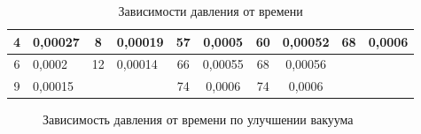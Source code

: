 \documentclass[a4paper, 12pt]{article}
\begin{document}
\begin{enumerate}
\begin{table}[!h]
{\begin{tabular}{|c|l|cl|c|c|c|c|cc}
				{\color[HTML]{000000} 4} & {\color[HTML]{000000} 0,00027} & \multicolumn{1}{c|}{{\color[HTML]{000000} 8}} & {\color[HTML]{000000} 0,00019} & {\color[HTML]{000000} 57} & {\color[HTML]{000000} 0,0005} & {\color[HTML]{000000} 60} & {\color[HTML]{000000} 0,00052} & \multicolumn{1}{c|}{{\color[HTML]{000000} 68}} & \multicolumn{1}{c|}{{\color[HTML]{000000} 0,0006}} \\ \hline
				{\color[HTML]{000000} 6} & {\color[HTML]{000000} 0,0002} & \multicolumn{1}{c|}{{\color[HTML]{000000} 12}} & {\color[HTML]{000000} 0,00014} & {\color[HTML]{000000} 66} & {\color[HTML]{000000} 0,00055} & {\color[HTML]{000000} 68} & {\color[HTML]{000000} 0,00056} & {\color[HTML]{000000} } & {\color[HTML]{000000} } \\ \cline{1-8}
				{\color[HTML]{000000} 9} & {\color[HTML]{000000} 0,00015} & {\color[HTML]{000000} } & {\color[HTML]{000000} } & {\color[HTML]{000000} 74} & {\color[HTML]{000000} 0,0006} & {\color[HTML]{000000} 74} & {\color[HTML]{000000} 0,0006} & {\color[HTML]{000000} } & {\color[HTML]{000000} } \\ \cline{1-2} \cline{5-8}
			\end{tabular}%
		}
	\caption{Зависимости давления от времени}	
	\end{table}

	\begin{figure}[!h]
		\begin{center}
		\end{center}
		\caption{Зависимость давления от времени по улучшении вакуума}
	\end{figure}


\end{enumerate}
\end{document}
